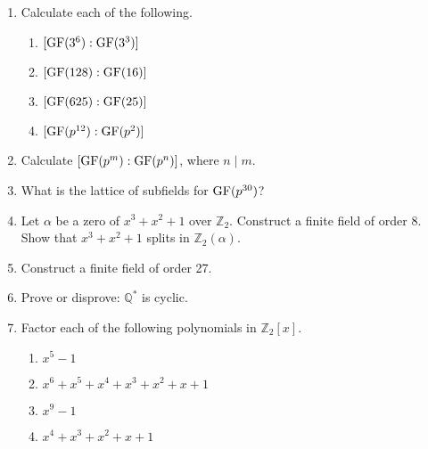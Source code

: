  
{\small
\begin{enumerate}

\item
Calculate each of the following.
\begin{multicols}{2}
\begin{enumerate}

\item 
$[{\rm GF}(3^6) : {\rm GF}(3^3)]$

\item 
$[{\rm GF}(128): {\rm GF}(16)]$

\item 
$[{\rm GF}(625) : {\rm GF}(25) ]$

\item 
$[{\rm GF}(p^{12}): {\rm GF}(p^2)]$


\end{enumerate}
\end{multicols}



\item
Calculate $[{\rm GF}(p^m): {\rm GF}(p^n)]$, where $n \mid m$.


\item
What is the lattice of subfields for ${\rm GF}(p^{30})$?


\item
Let $\alpha$ be a zero of $x^3 + x^2 + 1$ over ${\mathbb Z}_2$. 
Construct a finite field of order 8. Show that
$x^3 + x^2 + 1$ splits in ${\mathbb Z}_2(\alpha)$. 
 

\item
Construct a finite field of order 27.


\item
Prove or disprove: ${\mathbb Q}^\ast$ is cyclic.

 
\item
Factor each of the following polynomials in ${\mathbb Z}_2[x]$.

\begin{multicols}{2}
\begin{enumerate}

\item 
$x^5- 1$

\item 
$x^6 + x^5 + x^4 + x^3 + x^2 + x + 1$

\item 
$x^9 - 1$

\item 
$x^4 +x^3 + x^2 + x + 1$ 


\end{enumerate}
\end{multicols}




\end{enumerate}}
